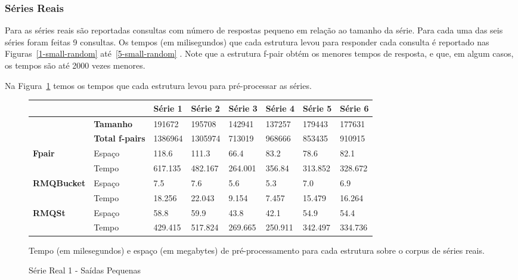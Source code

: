 \documentclass[12pt]{article}
\begin{document}
\subsubsection{Séries Reais}

Para as séries reais são reportadas consultas com número de respostas pequeno
em relação ao tamanho da série. Para cada uma das seis séries foram feitas
9 consultas. Os tempos (em milisegundos) que cada estrutura levou para responder
cada consulta é reportado nas Figuras~\ref{1-small-random} até~\ref{5-small-random}
. Note que a estrutura f-pair obtém os menores tempos de resposta,
e que, em algum casos, os tempos são até 2000 vezes menores.

Na Figura~\ref{pre-real} temos os tempos que cada estrutura levou para pré-processar
as séries.

\begin{figure}
\begin{tabular}{|l|l|l|l|l|l|l|l|}
\hline
      &    & Série 1 & Série 2 & Série 3 & Série 4 & Série 5 & Série 6\\
\hline
			& \textbf{Tamanho}  & 191672 & 195708   & 142941  & 137257  & 179443  & 177631 \\
\hline
			& \textbf{Total f-pairs}  & 1386964 & 1305974   & 713019  & 968666  & 853435 & 910915 \\
\hline
\multirow{2}{*}{\textbf{Fpair}} & Espaço & 118.6  & 111.3  & 66.4  & 83.2  & 78.6  & 82.1 \\
                       					& Tempo & 617.135 & 482.167 & 264.001 & 356.84 & 313.852 & 328.672\\
\hline
\multirow{2}{*}{\textbf{RMQBucket}} & Espaço & 7.5  & 7.6  & 5.6  & 5.3  & 7.0 & 6.9 \\
													 					& Tempo & 18.256 & 22.043 & 9.154 & 7.457 & 15.479 & 16.264\\
\hline
\multirow{2}{*}{\textbf{RMQSt}} & Espaço &  58.8 & 59.9 & 43.8 & 42.1 & 54.9 & 54.4\\
											 					& Tempo &  429.415 & 517.824 & 269.665 & 250.911 & 342.497 & 334.736\\
\hline
\end{tabular}
\label{pre-real}
\caption{Tempo (em milesegundos) e espaço (em megabytes) de pré-processamento para cada estrutura sobre
o corpus de séries reais.}
\end{figure}

\begin{figure}
\begin{center}

\caption{Série Real 1 - Saídas Pequenas}
\label{1-real}
\end{center}
\end{figure}
\end{document}
